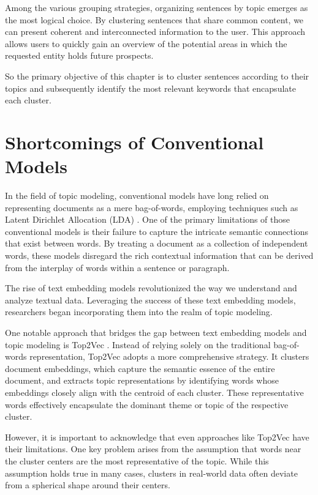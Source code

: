\documentclass[a4paper,10pt]{report} %
\begin{document}
Among the various grouping strategies, organizing sentences by topic emerges as the most logical choice. By clustering sentences that share common content, we can present coherent and interconnected information to the user. This approach allows users to quickly gain an overview of the potential areas in which the requested entity holds future prospects.

So the primary objective of this chapter is to cluster sentences according to their topics and subsequently identify the most relevant keywords that encapsulate each cluster.

\section{Shortcomings of Conventional Models}
In the field of topic modeling, conventional models have long relied on representing documents as a mere bag-of-words, employing techniques such as Latent Dirichlet Allocation (LDA) \cite{BleiLDA}. One of the primary limitations of those conventional models is their failure to capture the intricate semantic connections that exist between words. By treating a document as a collection of independent words, these models disregard the rich contextual information that can be derived from the interplay of words within a sentence or paragraph.

The rise of text embedding models revolutionized the way we understand and analyze textual data. Leveraging the success of these text embedding models, researchers began incorporating them into the realm of topic modeling.

One notable approach that bridges the gap between text embedding models and topic modeling is Top2Vec \cite{TopToVec}. Instead of relying solely on the traditional bag-of-words representation, Top2Vec adopts a more comprehensive strategy. It clusters document embeddings, which capture the semantic essence of the entire document, and extracts topic representations by identifying words whose embeddings closely align with the centroid of each cluster. These representative words effectively encapsulate the dominant theme or topic of the respective cluster.

However, it is important to acknowledge that even approaches like Top2Vec have their limitations. One key problem arises from the assumption that words near the cluster centers are the most representative of the topic. While this assumption holds true in many cases, clusters in real-world data often deviate from a spherical shape around their centers.
\end{document}
